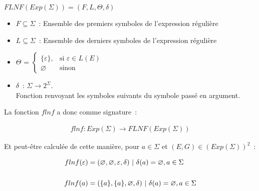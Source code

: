 \begin{center}
    \(FLNF(Exp(\Sigma)) = (F, L, \Theta, \delta)\)

    \begin{itemize}
        \item[\textbullet] \(F \subseteq \Sigma\)~: Ensemble des premiers
            symboles de l'expression régulière

            \vphantom{}

        \item[\textbullet] \(L \subseteq \Sigma\)~: Ensemble des derniers
            symboles de l'expression régulière

            \vphantom{}

        \item[\textbullet] \(\Theta\) =
            \(
            \begin{cases}
                \{ \varepsilon \}, & \text{si } \varepsilon \in L(E) \\
                \varnothing        & \text{sinon}
            \end{cases}
            \)

            \vphantom{}

        \item[\textbullet] \(\delta\)~: \(\Sigma \to 2^{\Sigma}\). \\
            Fonction renvoyant les symboles suivants du symbole passé en
            argument.
    \end{itemize}
\end{center}

La fonction \(flnf\) a donc comme signature~:

\begin{align*}
    flnf: Exp(\Sigma) \to FLNF(Exp(\Sigma))
\end{align*}

Et peut-être calculée de cette manière, pour \(a \in \Sigma\) et \((E, G) \in
(Exp(\Sigma))^2\)~:

\begin{align*}
    flnf(\varepsilon) & = (\varnothing, \varnothing, \varepsilon, \delta) ~|~
    \delta(a) = \varnothing, a \in \Sigma                                     \\
    \vphantom{} \notag                                                        \\
    flnf(a) & = (\{a\}, \{a\}, \varnothing, \delta) ~|~ \delta(a) =
    \varnothing, a \in \Sigma
\end{align*}

